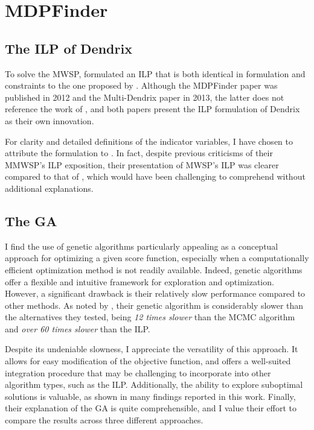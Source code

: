 \section{MDPFinder}

\subsection{The ILP of Dendrix}

To solve the MWSP, \textcite{mdpfinder} formulated an ILP that is both identical in formulation and constraints to the one proposed by \textcite{multi-dendrix}. Although the MDPFinder paper was published in 2012 and the Multi-Dendrix paper in 2013, the latter does not reference the work of \textcite{mdpfinder}, and both papers present the ILP formulation of Dendrix as their own innovation.

For clarity and detailed definitions of the indicator variables, I have chosen to attribute the formulation to \textcite{multi-dendrix}. In fact, despite previous criticisms of their MMWSP's ILP exposition, their presentation of MWSP's ILP was clearer compared to that of \textcite{mdpfinder}, which would have been challenging to comprehend without additional explanations.

\subsection{The GA}

I find the use of genetic algorithms particularly appealing as a conceptual approach for optimizing a given score function, especially when a computationally efficient optimization method is not readily available. Indeed, genetic algorithms offer a flexible and intuitive framework for exploration and optimization. However, a significant drawback is their relatively slow performance compared to other methods. As noted by \textcite{mdpfinder}, their genetic algorithm is considerably slower than the alternatives they tested, being \textit{12 times slower} than the MCMC algorithm and \textit{over 60 times slower} than the ILP.

Despite its undeniable slowness, I appreciate the versatility of this approach. It allows for easy modification of the objective function, and offers a well-suited integration procedure that may be challenging to incorporate into other algorithm types, such as the ILP. Additionally, the ability to explore suboptimal solutions is valuable, as shown in many findings reported in this work. Finally, their explanation of the GA is quite comprehensible, and I value their effort to compare the results across three different approaches.

